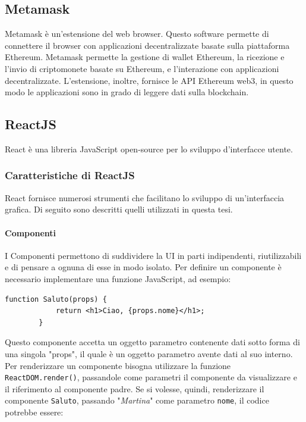 \documentclass[a4paper]{article}
\begin{document}
    \subsection{Metamask}
    Metamask è un'estensione del web browser. Questo software permette di connettere il browser con
    applicazioni decentralizzate basate sulla piattaforma Ethereum. Metamask permette la gestione di
    wallet Ethereum, la ricezione e l'invio di criptomonete basate su Ethereum, e l'interazione con
    applicazioni decentralizzate. L'estensione, inoltre, fornisce le API Ethereum web3, in questo
    modo le applicazioni sono in grado di leggere dati sulla blockchain\cite{metamask}.

    \subsection{ReactJS}
    React è una libreria JavaScript open-source per lo sviluppo d'interfacce utente.
    \subsubsection{Caratteristiche di ReactJS}
    React fornisce numerosi strumenti che facilitano lo sviluppo di un'interfaccia grafica. Di seguito sono descritti quelli utilizzati in questa tesi.
    \paragraph{Componenti}
    I Componenti permettono di suddividere la UI in parti indipendenti, riutilizzabili e di pensare a ognuna di esse in modo isolato.
    Per definire un componente è necessario implementare una funzione JavaScript, ad esempio:

    \begin{lstlisting}[style=ES6, title={Esempio componente}]
        function Saluto(props) {
            return <h1>Ciao, {props.nome}</h1>;
        }\end{lstlisting}

    Questo componente accetta un oggetto parametro contenente dati sotto forma di una singola
    "props", il quale è un oggetto parametro avente dati al suo interno.
    Per renderizzare un componente bisogna utilizzare la funzione \verb|ReactDOM.render()|,
    passandole come parametri il componente da visualizzare e il riferimento al componente padre.
    Se si volesse, quindi, renderizzare il componente \verb|Saluto|, passando "\emph{Martina}" come parametro \verb|nome|, il codice potrebbe essere:
    
\end{document}
